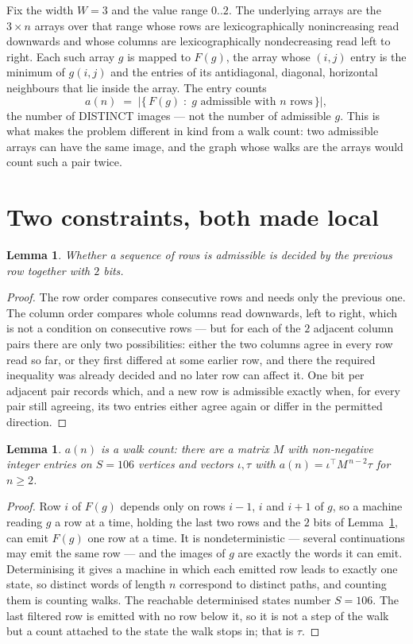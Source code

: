 \documentclass[11pt,a4paper]{article}
\theoremstyle{plain}
\newtheorem{lemma}[theorem]{Lemma}
\theoremstyle{definition}
\begin{document}
Fix the width $W=3$ and the value range $0..2$. The underlying arrays are the
$3\times n$ arrays over that range whose rows are lexicographically nonincreasing read downwards
and whose columns are lexicographically nondecreasing read left to right. Each such array $g$
is mapped to $F(g)$, the array whose $(i,j)$ entry is the minimum of $g(i,j)$ and the entries
of its antidiagonal, diagonal, horizontal neighbours that lie inside the array. The entry counts
\[
a(n)\;=\;\bigl|\{\,F(g)\;:\;g\text{ admissible with }n\text{ rows}\,\}\bigr|,
\]
the number of DISTINCT images --- not the number of admissible $g$. This is what makes the
problem different in kind from a walk count: two admissible arrays can have the same image, and
the graph whose walks are the arrays would count such a pair twice.

\section{Two constraints, both made local}

\begin{lemma}\label{lem:local}
Whether a sequence of rows is admissible is decided by the previous row together with
$2$ bits.
\end{lemma}

\begin{proof}
The row order compares consecutive rows and needs only the previous one. The column order
compares whole columns read downwards, left to right, which is not a condition on consecutive
rows --- but for each of the $2$ adjacent column pairs there are only two possibilities:
either the two columns agree in every row read so far, or they first differed at some earlier
row, and there the required inequality was already decided and no later row can affect it. One
bit per adjacent pair records which, and a new row is admissible exactly when, for every pair
still agreeing, its two entries either agree again or differ in the permitted direction.
\end{proof}

\begin{lemma}\label{lem:det}
$a(n)$ is a walk count: there are a matrix $M$ with non-negative integer entries on $S=106$
vertices and vectors $\iota,\tau$ with $a(n)=\iota^{\!\top}M^{\,n-2}\tau$ for $n\ge2$.
\end{lemma}

\begin{proof}
Row $i$ of $F(g)$ depends only on rows $i-1$, $i$ and $i+1$ of $g$, so a machine reading $g$ a
row at a time, holding the last two rows and the $2$ bits of Lemma~\ref{lem:local}, can
emit $F(g)$ one row at a time. It is nondeterministic --- several continuations may emit the
same row --- and the images of $g$ are exactly the words it can emit. Determinising it gives a
machine in which each emitted row leads to exactly one state, so distinct words of length $n$
correspond to distinct paths, and counting them is counting walks. The reachable determinised
states number $S=106$. The last filtered row is emitted with no row below it, so it is not a
step of the walk but a count attached to the state the walk stops in; that is $\tau$.
\end{proof}
\end{document}
